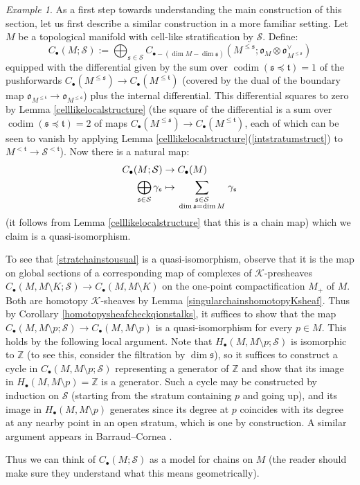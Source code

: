 \documentclass[12pt]{article}
\theoremstyle{definition}
\theoremstyle{remark}
\newtheorem{example}[theorem]{Example}
\numberwithin{equation}{subsection}
\newcommand{\K}{\mathcal K}
\newcommand{\s}{\mathfrak s}
\newcommand{\ttt}{\mathfrak t}
\newcommand{\oo}{\mathfrak o}
\newcommand{\ZZ}{\mathbb Z}
\newcommand{\SSS}{\mathcal S}
\newcommand{\codim}{\operatorname{codim}}
\begin{document}
\begin{example}\label{stratifiedchainsremark}
As a first step towards understanding the main construction of this section, let us first describe a similar construction in a more familiar setting.  Let $M$ be a topological manifold with cell-like stratification by $\SSS$.  Define:
\begin{equation}
C_\bullet(M;\SSS):=\bigoplus_{\s\in\SSS}C_{\bullet-(\dim M-\dim\s)}(M^{\leq\s};\oo_M\otimes\oo_{M^{\leq\s}}^\vee)
\end{equation}
equipped with the differential given by the sum over $\codim(\s\preceq\ttt)=1$ of the pushforwards $C_\bullet(M^{\leq\s})\to C_\bullet(M^{\leq\ttt})$ (covered by the dual of the boundary map $\oo_{M^{\leq\ttt}}\to\oo_{M^{\leq\s}}$) plus the internal differential.  This differential squares to zero by Lemma \ref{celllikelocalstructure} (the square of the differential is a sum over $\codim(\s\preceq\ttt)=2$ of maps $C_\bullet(M^{\leq\s})\to C_\bullet(M^{\leq\ttt})$, each of which can be seen to vanish by applying Lemma \ref{celllikelocalstructure}(\ref{intstratumstruct}) to $M^{<\ttt}\to\SSS^{<\ttt}$).  Now there is a natural map:
\begin{align}\label{stratchainstousual}
C_\bullet(M;\SSS)&\to C_\bullet(M)\\
\bigoplus_{\s\in\SSS}\gamma_\s&\mapsto\sum_{\begin{smallmatrix}\s\in\SSS\cr\dim\s=\dim M\end{smallmatrix}}\gamma_\s
\end{align}
(it follows from Lemma \ref{celllikelocalstructure} that this is a chain map) which we claim is a quasi-isomorphism.

To see that \eqref{stratchainstousual} is a quasi-isomorphism, observe that it is the map on global sections of a corresponding map of complexes of $\K$-presheaves $C_\bullet(M,M\setminus K;\SSS)\to C_\bullet(M,M\setminus K)$ on the one-point compactification $M_+$ of $M$.  Both are homotopy $\K$-sheaves by Lemma \ref{singularchainshomotopyKsheaf}.  Thus by Corollary \ref{homotopysheafcheckqionstalks}, it suffices to show that the map $C_\bullet(M,M\setminus p;\SSS)\to C_\bullet(M,M\setminus p)$ is a quasi-isomorphism for every $p\in M$.  This holds by the following local argument.  Note that $H_\bullet(M,M\setminus p;\SSS)$ is isomorphic to $\ZZ$ (to see this, consider the filtration by $\dim\s$), so it suffices to construct a cycle in $C_\bullet(M,M\setminus p;\SSS)$ representing a generator of $\ZZ$ and show that its image in $H_\bullet(M,M\setminus p)=\ZZ$ is a generator.  Such a cycle may be constructed by induction on $\SSS$ (starting from the stratum containing $p$ and going up), and its image in $H_\bullet(M,M\setminus p)$ generates since its degree at $p$ coincides with its degree at any nearby point in an open stratum, which is one by construction.  A similar argument appears in Barraud--Cornea \cite[p670, Lemma 2.2]{barraudcornea}.

Thus we can think of $C_\bullet(M;\SSS)$ as a model for chains on $M$ (the reader should make sure they understand what this means geometrically).
\end{example}
\end{document}
